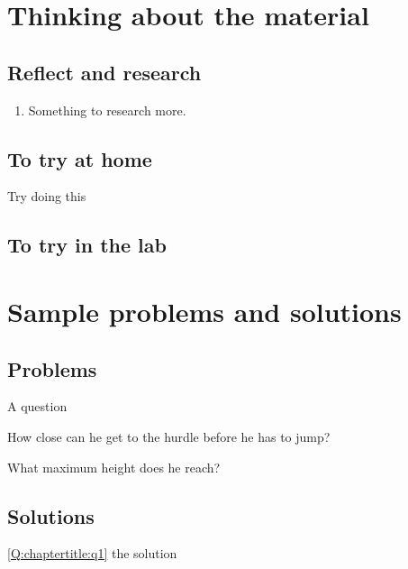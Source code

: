 \newpage
\section{Thinking about the material}
\subsection{Reflect and research}

\begin{enumerate}
\item Something to research more.
\end{enumerate}
\subsection{To try at home}

\begin{tQuestion}Try doing this \end{tQuestion}

\subsection{To try in the lab}

\newpage
\section{Sample problems and solutions}
\subsection{Problems}
\begin{problemParts}{A question\label{Q:chaptertitle:q1}}
\item How close can he get to the hurdle before he has to jump?
\item What maximum height does he reach?
\end{problemParts}

\newpage
\subsection{Solutions}
\begin{solution}{\ref{Q:chaptertitle:q1}}
{
the solution
}
\end{solution}

